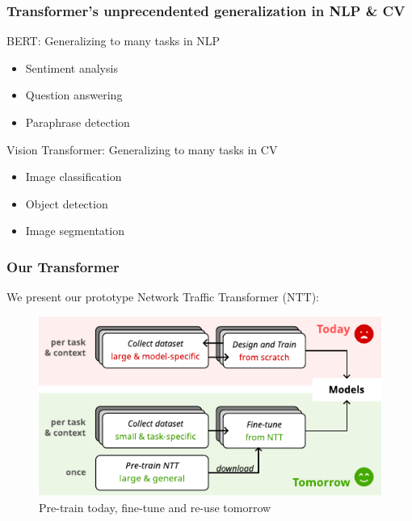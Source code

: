 \documentclass{beamer}
\begin{document}
\begin{frame}
\frametitle{Transformer's unprecendented generalization in NLP \& CV}
\pause

BERT: Generalizing to many tasks in NLP

\begin{itemize}  
    \item<1-> Sentiment analysis
    \item<1-> Question answering
    \item<1-> Paraphrase detection
\end{itemize}
\pause

Vision Transformer: Generalizing to many tasks in CV

\begin{itemize}  
    \item<1-> Image classification
    \item<1-> Object detection
    \item<1-> Image segmentation
\end{itemize}



\end{frame}


\begin{frame}
\frametitle{Our Transformer}

We present our prototype Network Traffic Transformer (NTT):
\pause

\begin{figure}[!hbt]
  \begin{center}
    \includegraphics[scale=1.1]{figures/vision.pdf}
    \caption{Pre-train today, fine-tune and re-use tomorrow}
    \label{fig:vision}
  \end{center}
\end{figure}
    
    
\end{frame}
\end{document}
